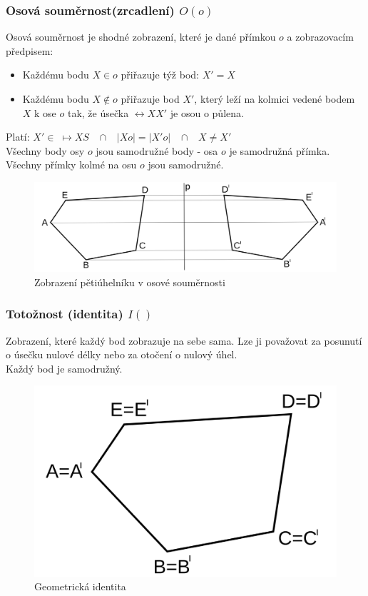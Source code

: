         \subsubsection{Osová souměrnost(zrcadlení) $O(o)$}
            Osová souměrnost je shodné zobrazení, které je dané přímkou $o$ a zobrazovacím předpisem:\\
            \begin{itemize}
                \item Každému bodu $X \in o$ přiřazuje týž bod: $X'=X$
                \item Každému bodu $X \notin o$ přiřazuje bod $X'$, který leží na kolmici vedené bodem $X$ k ose $o$ tak, že úsečka $\leftrightarrow XX'$ je osou o půlena.
            \end{itemize}
            Platí: $X' \in \; \mapsto XS \;\;\; \cap \;\;\; \left| Xo \right| = \left| X'o \right| \;\;\; \cap \;\;\; X \neq X'$\\
            Všechny body osy $o$ jsou samodružné body - osa $o$ je samodružná přímka.\\
            Všechny přímky kolmé na osu $o$ jsou samodružné.

            \begin{figure}[H]
                \centering
                \includegraphics[width=0.5\linewidth]{img/19_osova_soumernost.png}
                \caption{Zobrazení pětiúhelníku v osové souměrnosti} 
                \label{fig:enter-label}
            \end{figure}
            
        \subsubsection{Totožnost (identita) $I()$}
            Zobrazení, které každý bod zobrazuje na sebe sama. Lze ji považovat za posunutí o úsečku nulové délky nebo za otočení o nulový úhel.\\
            Každý bod je samodružný.

            \begin{figure}[H]
                \centering
                \includegraphics[width=0.5\linewidth]{img/19_identita.png}
                \caption{Geometrická identita} 
                \label{fig:enter-label}
            \end{figure}
            
